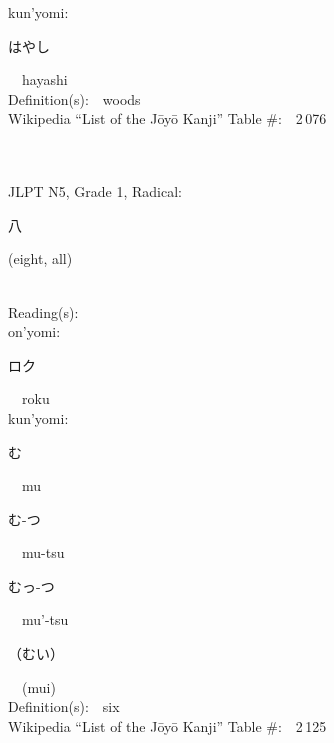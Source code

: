 \begin{multicols}{2}
{\hspace*{1em}}kun'yomi:\ \ \\
{\hspace*{2em}}{\begin{CJK}{UTF8}{min} はやし \end{CJK}}\ \ hayashi\ \ \\
Definition(s):\ \ woods \\
Wikipedia ``List of the J\=oy\=o Kanji'' Table \#:\ \ 2\,076 \\
\ \ \\
{\fontsize{34pt}{40pt}  }\ \ \\  %
{JLPT N5, Grade 1, Radical:\ \ {\begin{CJK}{UTF8}{min} 八 \end{CJK}} (eight, all) } \\
Reading(s):\ \ \\
{\hspace*{1em}}on'yomi:\ \ \\
{\hspace*{2em}}{\begin{CJK}{UTF8}{min} ロク \end{CJK}}\ \ roku\ \ \\
{\hspace*{1em}}kun'yomi:\ \ \\
{\hspace*{2em}}{\begin{CJK}{UTF8}{min} む \end{CJK}}\ \ mu\ \ \\
{\hspace*{2em}}{\begin{CJK}{UTF8}{min} む-つ \end{CJK}}\ \ mu-tsu\ \ \\
{\hspace*{2em}}{\begin{CJK}{UTF8}{min} むっ-つ \end{CJK}}\ \ mu'-tsu\ \ \\
{\hspace*{2em}}{\begin{CJK}{UTF8}{min} （むい） \end{CJK}}\ \ (mui)\ \ \\
Definition(s):\ \ six \\
Wikipedia ``List of the J\=oy\=o Kanji'' Table \#:\ \ 2\,125 \\
\ \ \\
\end{multicols}

